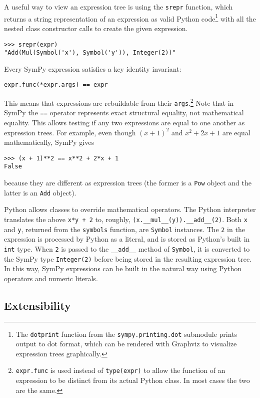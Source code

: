 A useful way to view an expression tree is using the \texttt{srepr} function, which
returns a string representation of an expression as valid Python code\footnote{
\label{note:dotprint}
The \texttt{dotprint} function from the \texttt{sympy.printing.dot} submodule
prints output to dot format, which can be rendered with Graphviz to
visualize expression trees graphically.}
with all the nested class constructor calls to create the given expression.
\begin{verbatim}
>>> srepr(expr)
"Add(Mul(Symbol('x'), Symbol('y')), Integer(2))"
\end{verbatim}

Every SymPy expression satisfies a key identity invariant:
\begin{verbatim}
expr.func(*expr.args) == expr
\end{verbatim}
This means that expressions are
rebuildable from their \texttt{args}.\footnote{\texttt{expr.func} is used
instead of \texttt{type(expr)} to allow the function of an expression to be
distinct from its actual Python class. In most cases the two are the same.}
Note that in SymPy the \texttt{==} operator represents exact
structural equality, not mathematical equality. This allows testing if any two
expressions are equal to one another as expression trees. For example, even
though ${(x + 1)}^2$ and $x^2 + 2x + 1$ are equal mathematically, SymPy gives
\begin{verbatim}
>>> (x + 1)**2 == x**2 + 2*x + 1
False
\end{verbatim}
because they are different as expression trees (the former is a \verb|Pow|
object and the latter is an \verb|Add| object).

Python allows classes to override mathematical operators. The Python
interpreter translates the above \texttt{x*y + 2} to, roughly,
\verb|(x.__mul__(y)).__add__(2)|. Both \texttt{x} and \texttt{y}, returned
from the \texttt{symbols} function, are \texttt{Symbol} instances. The
\texttt{2} in the expression is processed by Python as a literal, and is
stored as Python's built in \texttt{int} type. When \texttt{2} is passed to the
\verb|__add__| method of \texttt{Symbol}, it is converted to the SymPy type
\verb|Integer(2)| before being stored in the resulting expression tree. In
this way, SymPy expressions can be built in the natural way using Python
operators and numeric literals.


\subsection{Extensibility}

